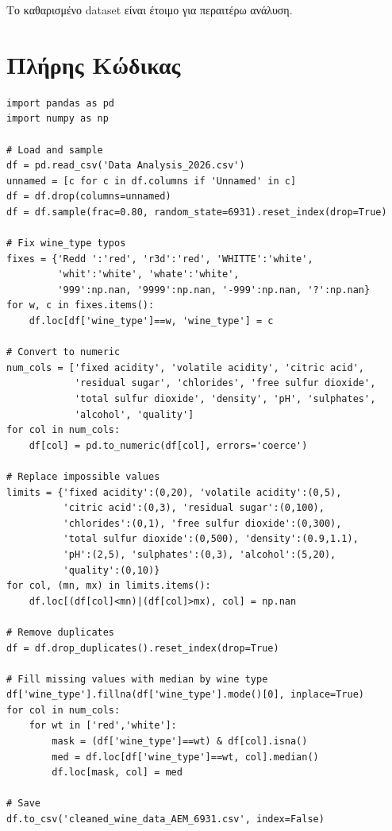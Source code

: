 \documentclass[12pt,a4paper]{article}
\begin{document}
\textgreek{Το καθαρισμένο dataset είναι έτοιμο για περαιτέρω ανάλυση.}

\newpage
\appendix
\section{\textgreek{Πλήρης Κώδικας}}

\begin{lstlisting}
import pandas as pd
import numpy as np

# Load and sample
df = pd.read_csv('Data Analysis_2026.csv')
unnamed = [c for c in df.columns if 'Unnamed' in c]
df = df.drop(columns=unnamed)
df = df.sample(frac=0.80, random_state=6931).reset_index(drop=True)

# Fix wine_type typos
fixes = {'Redd ':'red', 'r3d':'red', 'WHITTE':'white', 
         'whit':'white', 'whate':'white',
         '999':np.nan, '9999':np.nan, '-999':np.nan, '?':np.nan}
for w, c in fixes.items():
    df.loc[df['wine_type']==w, 'wine_type'] = c

# Convert to numeric
num_cols = ['fixed acidity', 'volatile acidity', 'citric acid',
            'residual sugar', 'chlorides', 'free sulfur dioxide',
            'total sulfur dioxide', 'density', 'pH', 'sulphates',
            'alcohol', 'quality']
for col in num_cols:
    df[col] = pd.to_numeric(df[col], errors='coerce')

# Replace impossible values
limits = {'fixed acidity':(0,20), 'volatile acidity':(0,5),
          'citric acid':(0,3), 'residual sugar':(0,100),
          'chlorides':(0,1), 'free sulfur dioxide':(0,300),
          'total sulfur dioxide':(0,500), 'density':(0.9,1.1),
          'pH':(2,5), 'sulphates':(0,3), 'alcohol':(5,20),
          'quality':(0,10)}
for col, (mn, mx) in limits.items():
    df.loc[(df[col]<mn)|(df[col]>mx), col] = np.nan

# Remove duplicates
df = df.drop_duplicates().reset_index(drop=True)

# Fill missing values with median by wine type
df['wine_type'].fillna(df['wine_type'].mode()[0], inplace=True)
for col in num_cols:
    for wt in ['red','white']:
        mask = (df['wine_type']==wt) & df[col].isna()
        med = df.loc[df['wine_type']==wt, col].median()
        df.loc[mask, col] = med

# Save
df.to_csv('cleaned_wine_data_AEM_6931.csv', index=False)
\end{lstlisting}
\end{document}
